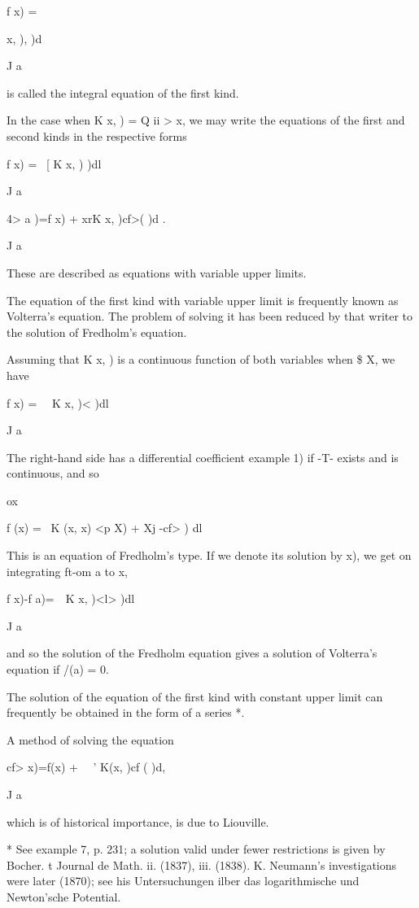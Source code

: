 f x) = \ \ \ \ {x, ), )d

J a

is called the integral equation of the first kind.

In the case when K x, ) = Q ii > x, we may write the equations of the
first and second kinds in the respective forms

f x) = \ [ K x, ) )dl

J a

4> a )=f x) + xrK x, )cf>( )d .

J a

These are described as equations with variable upper limits.


The equation of the first kind with variable upper limit is frequently
known as Volterra's equation. The problem of solving it has been
reduced by that writer to the solution of Fredholm's equation.

Assuming that K x, ) is a continuous function of both variables when
\$ X, we have

f x) = \ \ K x, )< )dl

J a

The right-hand side has a differential coefficient  example 1)
if -T- exists and is continuous, and so

ox

f (x) = \ K (x, x) <p X) + Xj -cf> ) dl

This is an equation of Fredholm's type. If we denote its solution by
x), we get on integrating ft-om a to x,

f x)-f a)=\ \ K x, )<l> )dl

J a

and so the solution of the Fredholm equation gives a solution of
Volterra's equation if /(a) = 0.

The solution of the equation of the first kind with constant upper
limit can frequently be obtained in the form of a series *.

A
method of solving the equation

cf> x)=f(x) + \ \ ' K(x, )cf ( )d,

J a

which is of historical importance, is due to Liouville.

* See example 7, p. 231; a solution valid under fewer restrictions is
given by Bocher. t Journal de Math. ii. (1837), iii. (1838). K.
Neumann's investigations were later (1870); see his Untersuchungen
ilber das logarithmische und Newton'sche Potential.

}
